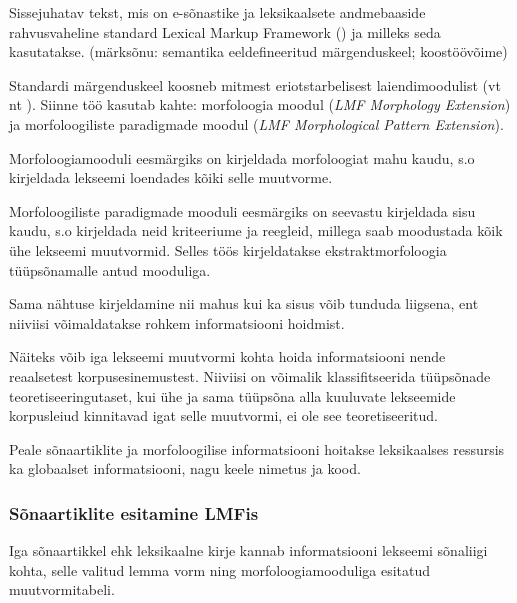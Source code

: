 \documentclass[12pt,a4paper]{article}
\begin{document}
Sissejuhatav tekst, mis on e-sõnastike ja leksikaalsete andmebaaside rahvusvaheline standard Lexical Markup Framework (\cite{iso/tc_37/sc_4_language_2007}) ja milleks seda kasutatakse. (märksõnu: semantika eeldefineeritud märgenduskeel; koostöövõime)

Standardi märgenduskeel koosneb mitmest eriotstarbelisest laiendimoodulist (vt nt \cite{francopoulo_lmf_2013}). Siinne töö kasutab kahte: morfoloogia moodul (\textit{LMF Morphology Extension}) ja morfoloogiliste paradigmade moodul (\textit{LMF Morphological Pattern Extension}).

Morfoloogiamooduli eesmärgiks on kirjeldada morfoloogiat mahu kaudu, s.o kirjeldada lekseemi loendades kõiki selle muutvorme.

Morfoloogiliste paradigmade mooduli eesmärgiks on seevastu kirjeldada sisu kaudu, s.o kirjeldada neid kriteeriume ja reegleid, millega saab moodustada kõik ühe lekseemi muutvormid. Selles töös kirjeldatakse ekstraktmorfoloogia tüüpsõnamalle antud mooduliga.

Sama nähtuse kirjeldamine nii mahus kui ka sisus võib tunduda liigsena, ent niiviisi võimaldatakse rohkem informatsiooni hoidmist.

Näiteks võib iga lekseemi muutvormi kohta hoida informatsiooni nende reaalsetest korpusesinemustest. Niiviisi on võimalik klassifitseerida tüüpsõnade teoretiseeringutaset, kui ühe ja sama tüüpsõna alla kuuluvate lekseemide korpusleiud kinnitavad igat selle muutvormi, ei ole see teoretiseeritud.


Peale sõnaartiklite ja morfoloogilise informatsiooni hoitakse leksikaalses ressursis ka globaalset informatsiooni, nagu keele nimetus ja kood.




\subsubsection{Sõnaartiklite esitamine LMFis}
Iga sõnaartikkel ehk leksikaalne kirje kannab informatsiooni lekseemi sõnaliigi kohta, selle valitud lemma vorm ning morfoloogiamooduliga esitatud muutvormitabeli.
\end{document}
